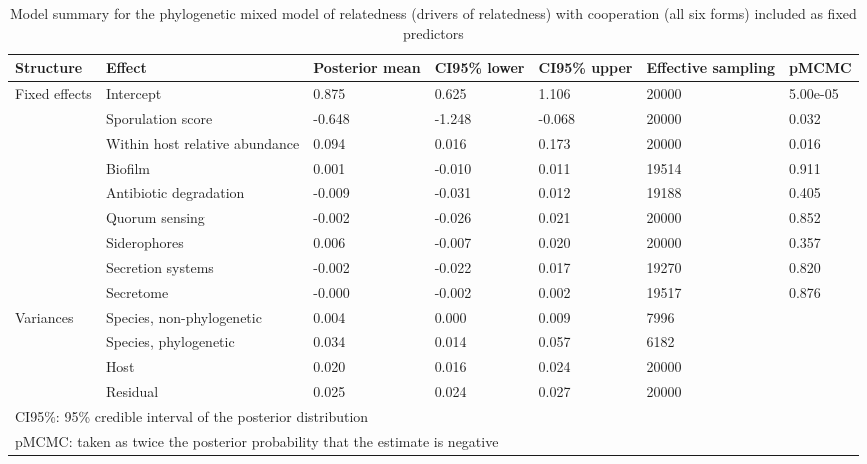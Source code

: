 \begin{table}

\caption{\label{tab:}Model summary for the phylogenetic mixed model of relatedness (drivers of relatedness) with cooperation (all six forms) included as fixed predictors}
\centering
\begin{tabular}[t]{lllllll}
\toprule
Structure & Effect & Posterior
 mean & CI95\% lower & CI95\% upper & Effective
 sampling & pMCMC\\
\midrule
Fixed effects & Intercept & 0.875 & 0.625 & 1.106 & 20000 & 5.00e-05\\
 & Sporulation score & -0.648 & -1.248 & -0.068 & 20000 & 0.032\\
 & Within host relative abundance & 0.094 & 0.016 & 0.173 & 20000 & 0.016\\
 & Biofilm & 0.001 & -0.010 & 0.011 & 19514 & 0.911\\
 & Antibiotic degradation & -0.009 & -0.031 & 0.012 & 19188 & 0.405\\
 & Quorum sensing & -0.002 & -0.026 & 0.021 & 20000 & 0.852\\
 & Siderophores & 0.006 & -0.007 & 0.020 & 20000 & 0.357\\
 & Secretion systems & -0.002 & -0.022 & 0.017 & 19270 & 0.820\\
 & Secretome & -0.000 & -0.002 & 0.002 & 19517 & 0.876\\
Variances & Species, non-phylogenetic & 0.004 & 0.000 & 0.009 & 7996 & \\
 & Species, phylogenetic & 0.034 & 0.014 & 0.057 & 6182 & \\
 & Host & 0.020 & 0.016 & 0.024 & 20000 & \\
 & Residual & 0.025 & 0.024 & 0.027 & 20000 & \\
\bottomrule
\multicolumn{7}{l}{\rule{0pt}{1em}CI95\%: 95\% credible interval of the posterior distribution}\\
\multicolumn{7}{l}{\rule{0pt}{1em}pMCMC: taken as twice the posterior probability that the estimate is negative}\\
\end{tabular}
\end{table}
